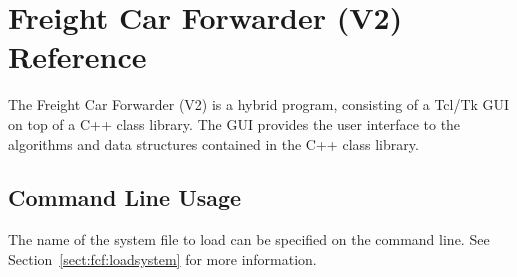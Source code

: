 
\chapter{Freight Car Forwarder (V2) Reference}
\label{chpt:fcf:Reference}

The Freight Car Forwarder (V2) is a hybrid program, consisting of a
Tcl/Tk GUI on top of a C++ class library.  The GUI provides the user
interface to the algorithms and data structures contained in the C++
class library.

\section{Command Line Usage}

The name of the system file to load can be specified on the command
line. See Section~\ref{sect:fcf:loadsystem} for more information.

